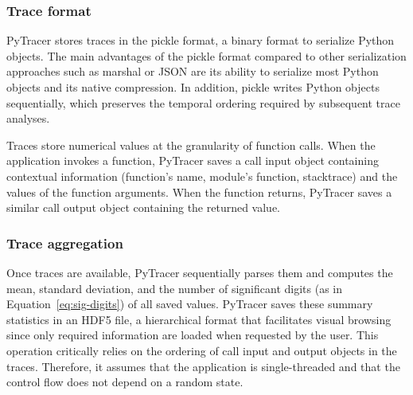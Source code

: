 \documentclass[11pt]{article}
\newcommand{\pytracer}[0]{PyTracer\xspace}
\begin{document}

\subsubsection{Trace format}

\pytracer stores traces in the pickle format, a binary format to serialize Python objects.
The main advantages of the pickle format compared to other serialization approaches such as marshal or JSON are its ability to serialize most Python objects and its native compression.  In addition, pickle writes Python objects sequentially, which preserves the temporal ordering required by subsequent trace analyses.

Traces store numerical values at the granularity of function calls. When the application invokes a function, \pytracer saves a call input object containing contextual information (function's name, module's function, stacktrace) and the values of the function arguments. When the function returns, \pytracer saves a similar call output object containing the returned value. 


\subsubsection{Trace aggregation}

Once traces are available, \pytracer sequentially parses them and computes the mean, standard deviation, and the number of significant digits (as in Equation~\ref{eq:sig-digits}) of all saved values. \pytracer saves these summary statistics in an HDF5 file, a hierarchical format that facilitates visual browsing since only
required information are loaded when requested by the user.
This operation critically relies on the ordering of call input and output objects in the traces. Therefore, it assumes that the application is single-threaded and that the control flow does not depend on a random state. 
\end{document}
